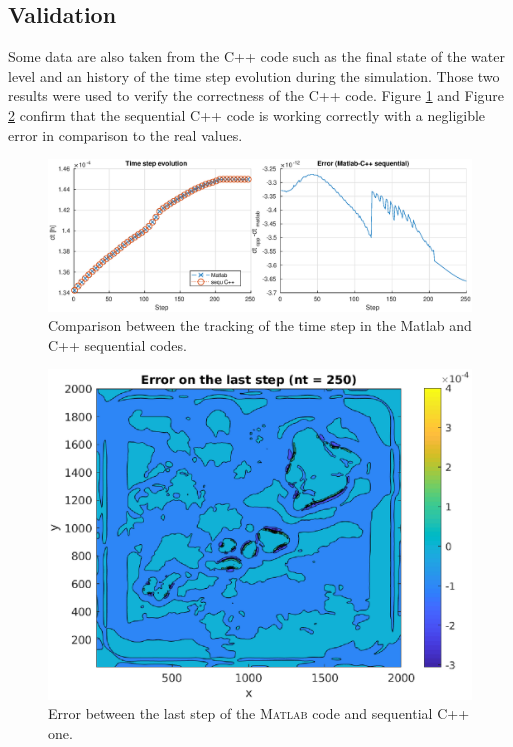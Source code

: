 \documentclass{article}
\begin{document}
\subsection{Validation}
Some data are also taken from the C++ code such as the final state of the water level and an history of the time step evolution during the simulation. Those two results were used to verify the correctness of the C++ code. Figure \ref{fig:dt_comparison_sequential} and Figure \ref{fig:matlab_sequCpp_error_solution} confirm that the sequential C++ code is working correctly with a negligible error in comparison to the real values.\\
\begin{figure}[!h]
\centering
\includegraphics[width=0.9\linewidth]{../figures/dt_comparison_sequential}
\caption{Comparison between the tracking of the time step in the Matlab and C++ sequential codes.}
\label{fig:dt_comparison_sequential}
\end{figure}
\begin{figure}[h!]
\centering
\includegraphics[width=0.7\linewidth]{../figures/matlab_sequCpp_error_solution}
\caption{Error between the last step of the \textsc{Matlab} code and sequential C++ one.}
\label{fig:matlab_sequCpp_error_solution}
\end{figure}
\end{document}

